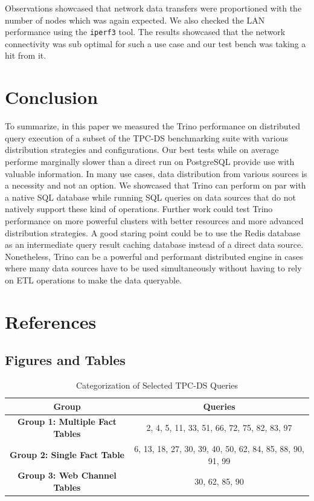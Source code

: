 \documentclass[conference]{IEEEtran}
\begin{document}
Observations showcased that network data transfers were proportioned with the number of nodes which was again expected. We also checked the LAN performance using the \texttt{iperf3} tool. The results showcased that the network connectivity was sub optimal for such a use case and our test bench was taking a hit from it.

\section{Conclusion}

To summarize, in this paper we measured the Trino performance on distributed query execution of a subset of the TPC-DS benchmarking suite with various distribution strategies and configurations. Our best tests while on average performe marginally slower than a direct run on PostgreSQL provide use with valuable information. In many use cases, data distribution from various sources is a necessity and not an option. We showcased that Trino can perform on par with a native SQL database while running SQL queries on data sources that do not natively support these kind of operations. Further work could test Trino performance on more powerful clusters with better resources and more advanced distribution strategies. A good staring point could be to use the Redis database as an intermediate query result caching database instead of a direct data source. Nonetheless, Trino can be a powerful and performant distributed engine in cases where many data sources have to be used simultaneously without having to rely on ETL operations to make the data queryable.
 
\section{References}

\subsection{Figures and Tables}
\begin{table}[htbp]
	\caption{Categorization of Selected TPC-DS Queries}
	\begin{center}
		\begin{tabular}{|c|c|}
			\hline
			\textbf{Group}                         & \textbf{Queries}                                          \\
			\hline
			\textbf{Group 1: Multiple Fact Tables} & 2, 4, 5, 11, 33, 51, 66, 72, 75, 82, 83, 97               \\
			\hline
			\textbf{Group 2: Single Fact Table}    & 6, 13, 18, 27, 30, 39, 40, 50, 62, 84, 85, 88, 90, 91, 99 \\
			\hline
			\textbf{Group 3: Web Channel Tables}   & 30, 62, 85, 90                                            \\
			\hline
		\end{tabular}
		\label{table:query-categorization}
	\end{center}
\end{table}
\end{document}
